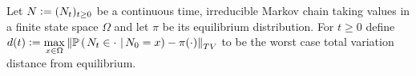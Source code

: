 \begin{definition}\label{def:eq_distance}
Let $N \vcentcolon= (N_t)_{t \geq 0}$ be a continuous time, irreducible Markov chain taking values in a finite state space $\Omega$ and let $\pi$ be its equilibrium distribution. For $t \geq 0$ define $d(t) \vcentcolon= \max\limits_{x \in \Omega} \left\Vert \mathbb{P} \left( \left. N_t \in \cdot\  \right| N_0 = x \right) - \pi(\cdot) \right\Vert_{TV}$ to be the worst case total variation distance from equilibrium. 
\end{definition}






